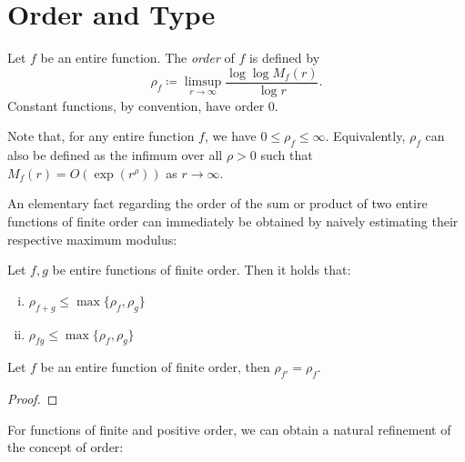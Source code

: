 \section{Order and Type}
\label{sec:order-type}

\begin{definition} \label{def:order}
    Let $f$ be an entire function. The \emph{order} of $f$ is defined by
    \begin{equation} \label{eq:def-order}
        \rho_f \coloneqq \limsup_{r \to \infty} \frac{\log \log M_f(r)}{\log r}.
    \end{equation}
    Constant functions, by convention, have order 0.
\end{definition}

Note that, for any entire function $f$, we have $0 \leq \rho_f \leq \infty$. Equivalently, $\rho_f$ can also be defined as the infimum over all $\rho > 0$ such that $M_f(r) = O(\exp(r^\rho))$ as $r \to \infty$.


An elementary fact regarding the order of the sum or product of two entire functions of finite order can immediately be obtained by naively estimating their respective maximum modulus:

\begin{proposition} \label{prop:algebraic-properties-order}
    Let $f, g$ be entire functions of finite order. Then it holds that:
    \begin{enumerate}[i.]
        \item $\rho_{f + g} \leq \max \{ \rho_f, \rho_g \}$
        \item $\rho_{f g} \leq \max \{ \rho_f, \rho_g \}$
    \end{enumerate}
\end{proposition}

\begin{proposition} \label{prop:order-derivative}
    Let $f$ be an entire function of finite order, then $\rho_{f'} = \rho_f$.
\end{proposition}

\begin{proof}
\end{proof}

For functions of finite and positive order, we can obtain a natural refinement of the concept of order:

